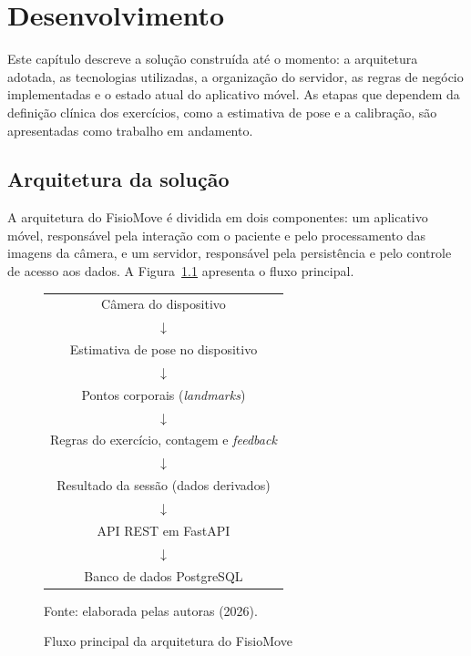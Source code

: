 
\chapter{Desenvolvimento}
\label{cap:desenvolvimento}

Este capítulo descreve a solução construída até o momento: a arquitetura adotada, as tecnologias utilizadas, a organização do servidor, as regras de negócio implementadas e o estado atual do aplicativo móvel. As etapas que dependem da definição clínica dos exercícios, como a estimativa de pose e a calibração, são apresentadas como trabalho em andamento.

\section{Arquitetura da solução}
\label{sec:arquitetura}

A arquitetura do FisioMove é dividida em dois componentes: um aplicativo móvel, responsável pela interação com o paciente e pelo processamento das imagens da câmera, e um servidor, responsável pela persistência e pelo controle de acesso aos dados. A Figura~\ref{fig:arquitetura} apresenta o fluxo principal.

\begin{figure}[htbp]
    \centering
    \caption{Fluxo principal da arquitetura do FisioMove}
    \label{fig:arquitetura}
    \begin{tabular}{c}
        Câmera do dispositivo \\
        $\downarrow$ \\
        Estimativa de pose no dispositivo \\
        $\downarrow$ \\
        Pontos corporais (\textit{landmarks}) \\
        $\downarrow$ \\
        Regras do exercício, contagem e \textit{feedback} \\
        $\downarrow$ \\
        Resultado da sessão (dados derivados) \\
        $\downarrow$ \\
        API REST em FastAPI \\
        $\downarrow$ \\
        Banco de dados PostgreSQL \\
    \end{tabular}
    \par\medskip
    Fonte: elaborada pelas autoras (2026).
\end{figure}

